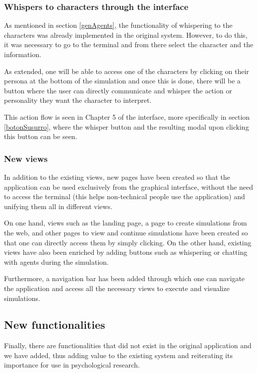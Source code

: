 \subsubsection{Whispers to characters through the interface}
As mentioned in section \ref{genAgents}, the functionality of whispering to the characters was already implemented in the original system. However, to do this, it was necessary to go to the terminal and from there select the character and the information.

As extended, one will be able to access one of the characters by clicking on their persona at the bottom of the simulation and once this is done, there will be a button where the user can directly communicate and whisper the action or personality they want the character to interpret.

This action flow is seen in Chapter 5 of the interface, more specifically in section \ref{botonSusurro}, where the whisper button and the resulting modal upon clicking this button can be seen.

\subsubsection{New views}
In addition to the existing views, new pages have been created so that the application can be used exclusively from the graphical interface, without the need to access the terminal (this helps non-technical people use the application) and unifying them all in different views.

On one hand, views such as the landing page, a page to create simulations from the web, and other pages to view and continue simulations have been created so that one can directly access them by simply clicking. On the other hand, existing views have also been enriched by adding buttons such as whispering or chatting with agents during the simulation.

Furthermore, a navigation bar has been added through which one can navigate the application and access all the necessary views to execute and visualize simulations.

\subsection{New functionalities}
Finally, there are functionalities that did not exist in the original application and we have added, thus adding value to the existing system and reiterating its importance for use in psychological research.

